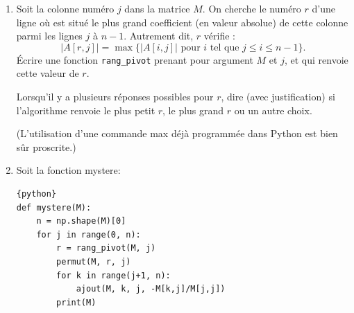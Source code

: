 \begin{exercice} 
\begin{enumerate}
\begin{enumerate}
\item Que réalise la fonction multip?
\begin{lstlisting}{python}
def multip(M, i, c):
    p = np.shape(M)[1]
    for k in range(0, p):
        M[i,k] = c*M[i,k]
\end{lstlisting}


\item Compléter la fonction ajout, afin qu'elle effectue l'opération $L_{i} \leftarrow L_{i}+c L_{j}$.
\begin{lstlisting}{python}
def ajout(M, i, j, c):
    p = np.shape(M)[1]
    for k in range(0, p):
        _____ ligne(s) a completer _____ 
\end{lstlisting}

\item Écrire une fonction permut prenant pour argument $M, i$ et $j$, et qui modifie $M$ en échangeant les valeurs des lignes $i$ et $j$.
\end{enumerate}
Dans la suite du sujet, l'expression "opération élémentaire sur les lignes" fera référence à l'utilisation de permut, multip ou ajout.
\item  Soit la colonne numéro $j$ dans la matrice $M$. On cherche le numéro $r$ d'une ligne où est situé le plus grand coefficient (en valeur absolue) de cette colonne parmi les lignes $j$ à $n-1$. Autrement dit, $r$ vérifie :
$$
|A[r, j]|=\max \{|A[i, j]| \text { pour } i \text { tel que } j \leq i \leq n-1\} .
$$
Écrire une fonction \texttt{rang\_pivot} prenant pour argument $M$ et $j$, et qui renvoie cette valeur de $r$.

 Lorsqu'il y a plusieurs réponses possibles pour $r$, dire (avec justification) si l'algorithme renvoie le plus petit $r$, le plus grand $r$ ou un autre choix.
 
  (L'utilisation d'une commande max déjà programmée dans Python est bien sûr proscrite.)
  
\item Soit la fonction mystere:
\begin{lstlisting}{python}
def mystere(M):
    n = np.shape(M)[0]
    for j in range(0, n):
        r = rang_pivot(M, j)
        permut(M, r, j)
        for k in range(j+1, n):
            ajout(M, k, j, -M[k,j]/M[j,j])
        print(M) 
\end{lstlisting} 


\end{enumerate}
\end{exercice}
